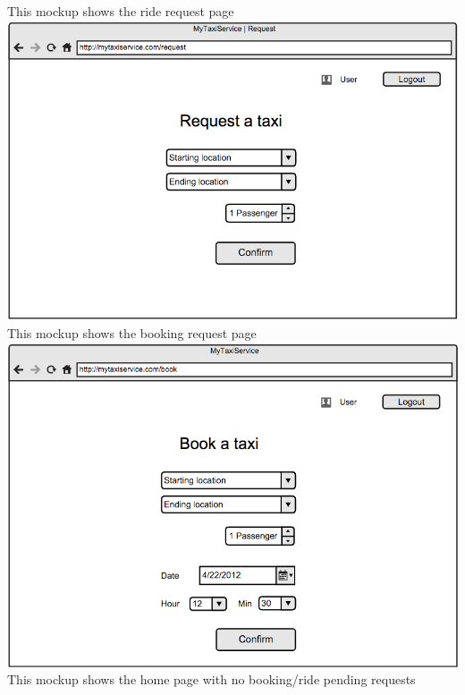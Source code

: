 \documentclass[11pt,titlepage]{article} %
\begin{document}
        \noindent
        This mockup shows the ride request page\newline
        \newline
        \includegraphics[scale=0.52]{taxiReqInt.png}\newline
        \newpage
        \noindent
        This mockup shows the booking request page\newline
       \newline
        \includegraphics[scale=0.52]{taxiBookInt.png}\newline
        \newpage
        \noindent
        This mockup shows the home page with no booking/ride pending requests\newline
        \newline
\end{document}
